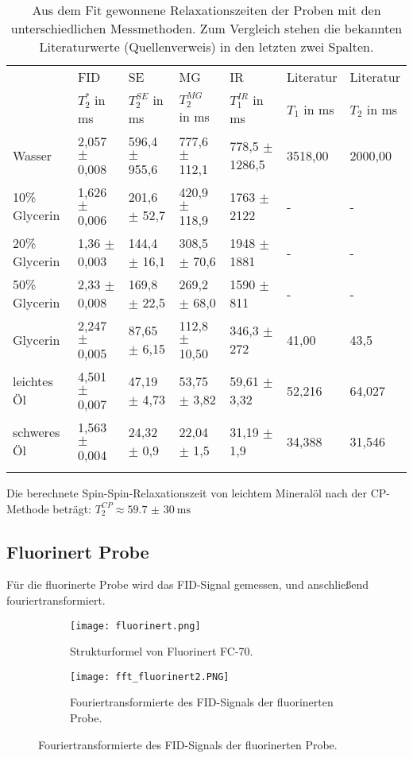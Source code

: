 \documentclass[10pt,twoside]{article}
\renewcommand{\1}{^{-1}}
\renewcommand{\2}{^{-2}}
\newcommand{\3}{^{-3}}
\newcommand{\4}{^{-4}}
\newcommand{\5}{^{-5}}
\newcommand{\6}{^{-6}}
\newcommand{\7}{^{-7}}
\newcommand{\8}{^{-8}}
\newcommand{\9}{^{-9}}
\begin{document}
\begin{landscape}
\begin{table}[H]
\centering
\caption{Aus dem Fit gewonnene Relaxationszeiten der Proben mit den unterschiedlichen Messmethoden. Zum Vergleich stehen die bekannten Literaturwerte (Quellenverweis) in den letzten zwei Spalten.}
\begin{tabular}{lllllll}
		\hline
       & FID          & SE          & MG          & IR          & Literatur   & Literatur   \\ 
       & $T_2^*$ in ms& $T_2^{SE}$ in ms	& $T_2^{MG}$ in ms	& $T_1^{IR}$ in ms	& $T_1$ in ms	& $T_2$ in ms	\\
       \hline
Wasser & 2,057 $ \pm $ 0,008 & 596,4 $\pm$ 955,6 & 777,6 $\pm$ 112,1 & 778,5 $\pm$ 1286,5 & 3518,00 & 2000,00 \\
10\% Glycerin   & 1,626 $\pm$ 0,006 & 201,6 $\pm$ 52,7  & 420,9 $\pm$ 118,9 & 1763 $\pm$ 2122 & - & - \\
20\%  Glycerin & 1,36 $\pm$ 0,003  & 144,4 $\pm$ 16,1  & 308,5 $\pm$ 70,6  & 1948 $\pm$ 1881  & - & - \\
50\% Glycerin  & 2,33 $\pm$ 0,008  & 169,8 $\pm$ 22,5  & 269,2 $\pm$ 68,0  & 1590 $\pm$ 811  & - & - \\
Glycerin  & 2,247 $\pm$ 0,005 & 87,65 $\pm$ 6,15  & 112,8 $\pm$ 10,50 & 346,3 $\pm$ 272 & 41,00 & 43,5 \\
leichtes Öl & 4,501 $\pm$ 0,007 & 47,19 $\pm$ 4,73  & 53,75 $\pm$ 3,82  & 59,61 $\pm$ 3,32  & 52,216 & 64,027 \\
schweres Öl & 1,563 $\pm$ 0,004 & 24,32 $\pm$ 0,9   & 22,04 $\pm$ 1,5   & 31,19 $\pm$ 1,9  & 34,388 & 31,546 \\
\hline
\label{tab:relaxationszeiten}
\end{tabular}
\end{table}

Die berechnete Spin-Spin-Relaxationszeit von leichtem Mineralöl nach der CP-Methode beträgt: $T_{2}^{CP} \approx  \SI{59,7(30)}{\milli\second} $

\end{landscape}

\subsection{Fluorinert Probe}

Für die fluorinerte Probe wird das FID-Signal gemessen, und anschließend fouriertransformiert.
\begin{figure}[H]
\centering
\begin{subfigure}{.4\textwidth}
\texttt{[image: fluorinert.png]} 
\caption{Strukturformel von Fluorinert FC-70.}
\label{fig:fluorinert}
\end{subfigure} %
\begin{subfigure}{.59\textwidth}
\centering
\texttt{[image: fft\_fluorinert2.PNG]} 
\caption{Fouriertransformierte des FID-Signals der fluorinerten Probe.}
\label{fig:fft}
\end{subfigure}
\end{figure}
\end{document}
